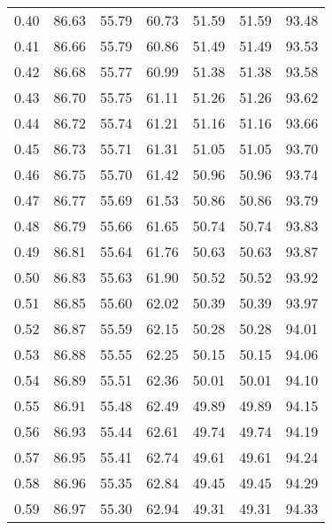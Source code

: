 \begin{tabular}{|c|c|c|c|c|c|c|}
      0.40 &     86.63 &     55.79 &      60.73 &   51.59 &      51.59 &         93.48 \\
      0.41 &     86.66 &     55.79 &      60.86 &   51.49 &      51.49 &         93.53 \\
      0.42 &     86.68 &     55.77 &      60.99 &   51.38 &      51.38 &         93.58 \\
      0.43 &     86.70 &     55.75 &      61.11 &   51.26 &      51.26 &         93.62 \\
      0.44 &     86.72 &     55.74 &      61.21 &   51.16 &      51.16 &         93.66 \\
      0.45 &     86.73 &     55.71 &      61.31 &   51.05 &      51.05 &         93.70 \\
      0.46 &     86.75 &     55.70 &      61.42 &   50.96 &      50.96 &         93.74 \\
      0.47 &     86.77 &     55.69 &      61.53 &   50.86 &      50.86 &         93.79 \\
      0.48 &     86.79 &     55.66 &      61.65 &   50.74 &      50.74 &         93.83 \\
      0.49 &     86.81 &     55.64 &      61.76 &   50.63 &      50.63 &         93.87 \\
      0.50 &     86.83 &     55.63 &      61.90 &   50.52 &      50.52 &         93.92 \\
      0.51 &     86.85 &     55.60 &      62.02 &   50.39 &      50.39 &         93.97 \\
      0.52 &     86.87 &     55.59 &      62.15 &   50.28 &      50.28 &         94.01 \\
      0.53 &     86.88 &     55.55 &      62.25 &   50.15 &      50.15 &         94.06 \\
      0.54 &     86.89 &     55.51 &      62.36 &   50.01 &      50.01 &         94.10 \\
      0.55 &     86.91 &     55.48 &      62.49 &   49.89 &      49.89 &         94.15 \\
      0.56 &     86.93 &     55.44 &      62.61 &   49.74 &      49.74 &         94.19 \\
      0.57 &     86.95 &     55.41 &      62.74 &   49.61 &      49.61 &         94.24 \\
      0.58 &     86.96 &     55.35 &      62.84 &   49.45 &      49.45 &         94.29 \\
      0.59 &     86.97 &     55.30 &      62.94 &   49.31 &      49.31 &         94.33 \\

\end{tabular}

